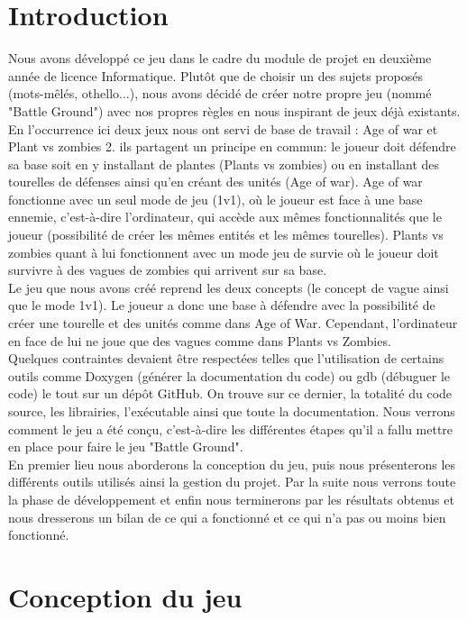 \documentclass[a4paper,11pt]{article}
\begin{document}
\section {Introduction}
Nous avons développé ce jeu dans le cadre du module de projet en deuxième année de licence Informatique. Plutôt que de choisir un des sujets proposés (mots-mêlés, othello...), nous avons décidé de créer notre propre jeu (nommé "Battle Ground") avec nos propres règles en nous inspirant de jeux déjà existants.\\ 
En l'occurrence ici deux jeux nous ont servi de base de travail : Age of war et Plant vs zombies 2. ils partagent un principe en commun: le joueur doit défendre sa base soit en y installant de plantes (Plants vs zombies) ou en installant des tourelles de défenses ainsi qu'en créant des unités (Age of war). Age of war fonctionne avec un seul mode de jeu (1v1), où le joueur est face à une base ennemie, c'est-à-dire l'ordinateur, qui accède aux mêmes fonctionnalités que le joueur (possibilité de créer les mêmes entités et les mêmes tourelles). Plants vs zombies quant à lui fonctionnent avec un mode jeu de survie où le joueur doit survivre à des vagues de zombies qui arrivent sur sa base.\\
Le jeu que nous avons créé reprend les deux concepts (le concept de vague ainsi que le mode 1v1). 
Le joueur a donc une base à défendre avec la possibilité de créer une tourelle et des unités comme dans Age of War. Cependant, l'ordinateur en face de lui ne joue que des vagues comme dans Plants vs Zombies.\\
Quelques contraintes devaient être respectées telles que l'utilisation de certains outils comme Doxygen (générer la documentation du code) ou
gdb (débuguer le code) le tout sur un dépôt GitHub. On trouve sur ce dernier, la totalité du code source, les librairies, l'exécutable ainsi
que toute la documentation.
Nous verrons comment le jeu a été conçu, c'est-à-dire les différentes étapes qu'il a fallu mettre en place pour faire le jeu "Battle Ground".\\
En premier lieu nous aborderons la conception du jeu, puis nous présenterons les différents outils utilisés ainsi la gestion du projet. Par la suite
nous verrons toute la phase de développement et enfin nous terminerons par les résultats obtenus et nous dresserons un bilan de ce qui a fonctionné et ce qui n'a pas
ou moins bien fonctionné.
\newpage

\section {Conception du jeu}
\end{document}
